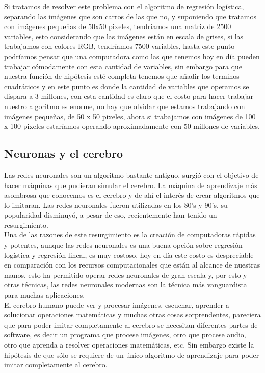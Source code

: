 \documentclass{report}
\begin{document}
Si tratamos de resolver este problema con el algoritmo de regresión logística, separando las imágenes que son carros de las que no, y suponiendo que tratamos con imágenes pequeñas de 50x50 pixeles, tendríamos una matriz de 2500 variables, esto considerando que las imágenes están en escala de grises, si las trabajamos con colores RGB, tendríamos 7500 variables, hasta este punto podríamos pensar que una computadora como las que tenemos hoy en día pueden trabajar cómodamente con esta cantidad de variables, sin embargo para que nuestra función de hipótesis esté completa tenemos que añadir los terminos cuadráticos y en este punto es donde la cantidad de variables que operamos se dispara a 3 millones, con esta cantidad es claro que el costo para hacer trabajar nuestro algoritmo es enorme, no hay que olvidar que estamos trabajando con imágenes pequeñas, de 50 x 50 pixeles, ahora si trabajamos con imágenes de 100 x 100 pixeles estaríamos operando aproximadamente con 50 millones de variables.

\subsection{Neuronas y el cerebro}
Las redes neuronales son un algoritmo bastante antiguo, surgió con el objetivo de hacer máquinas que pudieran simular el cerebro. La máquina de aprendizaje más asombrosa que conocemos es el cerebro y de ahí el interés de crear algoritmos que lo imitaran. Las redes neuronales fueron utilizadas en los 80's y 90's, su popularidad disminuyó, a pesar de eso, recientemente han tenido un resurgimiento.\\

Una de las razones de este resurgimiento es la creación de computadoras rápidas y potentes, aunque las redes neuronales es una buena opción sobre regresión logística y regresión lineal, es muy costoso, hoy en día este costo es despreciable en comparación con los recursos computacionales que están al alcance de nuestras manos, esto ha permitido operar redes neuronales de gran escala y, por esto y otras técnicas, las redes neuronales modernas son la técnica más vanguardista para muchas aplicaciones.\\

El cerebro humano puede ver y procesar imágenes, escuchar, aprender a solucionar operaciones matemáticas y muchas otras cosas sorprendentes, pareciera que para poder imitar completamente al cerebro se necesitan diferentes partes de software, es decir un programa que procese imágenes, otro que procese audio, otro que aprenda a resolver operaciones matemáticas, etc. Sin embargo existe la hipótesis de que sólo se requiere de un único algoritmo de aprendizaje para poder imitar completamente al cerebro.\\
\end{document}
